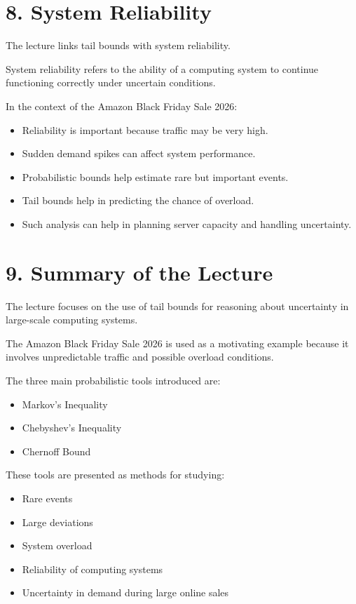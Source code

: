 \documentclass[12pt]{article}
\begin{document}
\section*{8. System Reliability}

The lecture links tail bounds with system reliability.

System reliability refers to the ability of a computing system to continue functioning correctly under uncertain conditions.

In the context of the Amazon Black Friday Sale 2026:

\begin{itemize}
    \item Reliability is important because traffic may be very high.
    \item Sudden demand spikes can affect system performance.
    \item Probabilistic bounds help estimate rare but important events.
    \item Tail bounds help in predicting the chance of overload.
    \item Such analysis can help in planning server capacity and handling uncertainty.
\end{itemize}

\section*{9. Summary of the Lecture}

The lecture focuses on the use of tail bounds for reasoning about uncertainty in large-scale computing systems.

The Amazon Black Friday Sale 2026 is used as a motivating example because it involves unpredictable traffic and possible overload conditions.

The three main probabilistic tools introduced are:

\begin{itemize}
    \item Markov’s Inequality
    \item Chebyshev’s Inequality
    \item Chernoff Bound
\end{itemize}

These tools are presented as methods for studying:

\begin{itemize}
    \item Rare events
    \item Large deviations
    \item System overload
    \item Reliability of computing systems
    \item Uncertainty in demand during large online sales
\end{itemize}
\end{document}
